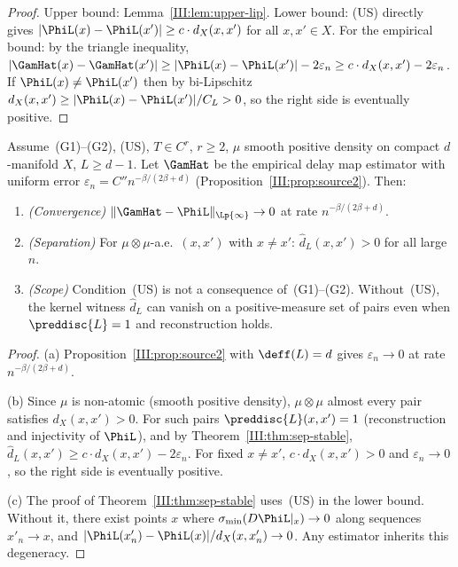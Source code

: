 \begin{proof}
Upper bound: Lemma~\ref{III:lem:upper-lip}.
Lower bound: (US) directly gives $|\PhiL(x) - \PhiL(x')| \geq c \cdot d_X(x,x')$
for all $x, x' \in X$.
For the empirical bound: by the triangle inequality,
$|\GamHat(x) - \GamHat(x')| \geq |\PhiL(x) - \PhiL(x')| - 2\varepsilon_n
\geq c \cdot d_X(x,x') - 2\varepsilon_n$.
If $\PhiL(x) \neq \PhiL(x')$ then by bi-Lipschitz $d_X(x,x') \geq |\PhiL(x)-\PhiL(x')|/C_L > 0$,
so the right side is eventually positive.
\end{proof}

\begin{theorem}
\label{III:thm:dynamics}
Assume~(G1)--(G2), (US), $T \in C^r$, $r \geq 2$, $\mu$ smooth positive
density on compact $d$-manifold $X$, $L \geq d-1$.
Let $\GamHat$ be the empirical delay map estimator with uniform error
$\varepsilon_n = C'' n^{-\beta/(2\beta+d)}$ (Proposition~\ref{III:prop:source2}).
Then:
\begin{enumerate}[label=(\alph*)]
  \item \emph{(Convergence)} $\|\GamHat - \PhiL\|_{\Lp{\infty}} \to 0$ at
    rate $n^{-\beta/(2\beta+d)}$.
  \item \emph{(Separation)} For $\mu \otimes \mu$-a.e.\ $(x,x')$ with
    $x \neq x'$: $\widehat{d}_L(x,x') > 0$ for all large $n$.
  \item \emph{(Scope)} Condition~(US) is not a consequence of~(G1)--(G2).
    Without~(US), the kernel witness $\widehat{d}_L$ can vanish on a positive-measure
    set of pairs even when $\preddisc{L} = 1$ and reconstruction holds.
\end{enumerate}
\end{theorem}

\begin{proof}
(a) Proposition~\ref{III:prop:source2} with $\deff(L) = d$ gives
$\varepsilon_n \to 0$ at rate $n^{-\beta/(2\beta+d)}$.

(b) Since $\mu$ is non-atomic (smooth positive density), $\mu \otimes \mu$
almost every pair satisfies $d_X(x,x') > 0$.
For such pairs $\preddisc{L}(x,x') = 1$ (reconstruction and injectivity of $\PhiL$),
and by Theorem~\ref{III:thm:sep-stable}, $\widehat{d}_L(x,x') \geq c \cdot d_X(x,x') - 2\varepsilon_n$.
For fixed $x \neq x'$, $c \cdot d_X(x,x') > 0$ and $\varepsilon_n \to 0$,
so the right side is eventually positive.

(c) The proof of Theorem~\ref{III:thm:sep-stable} uses~(US) in the lower bound.
Without it, there exist points $x$ where $\sigma_{\min}(D\PhiL|_x) \to 0$
along sequences $x'_n \to x$, and $|\PhiL(x_n') - \PhiL(x)| / d_X(x,x'_n) \to 0$.
Any estimator inherits this degeneracy.
\end{proof}

